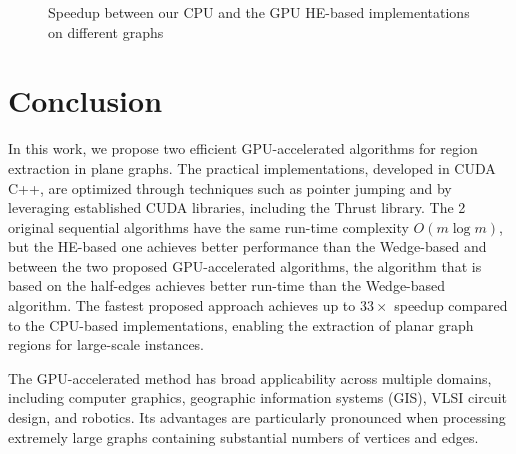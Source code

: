 \documentclass[conference]{IEEEtran}
\begin{document}
\begin{figure}[ht]
\caption{Speedup between our CPU and the GPU HE-based implementations on different graphs}
\label{fig:speedup}
\end{figure}


\section{Conclusion}
In this work, we propose two efficient GPU-accelerated algorithms for region extraction in plane graphs. The practical implementations, developed in CUDA C++, are optimized through techniques such as pointer jumping and by leveraging established CUDA libraries, including the Thrust library. The 2 original sequential algorithms have the same run-time complexity $O(m \log m)$, but the HE-based one achieves better performance than the Wedge-based and between the two proposed GPU-accelerated algorithms, the algorithm that is based on the half-edges achieves better run-time than the Wedge-based algorithm. The fastest proposed approach achieves up to $33\times$ speedup compared to the CPU-based implementations, enabling the extraction of planar graph regions for large-scale instances.

The GPU-accelerated method has broad applicability across multiple domains, including computer graphics, geographic information systems (GIS), VLSI circuit design, and robotics. Its advantages are particularly pronounced when processing extremely large graphs containing substantial numbers of vertices and edges.



\end{document}
